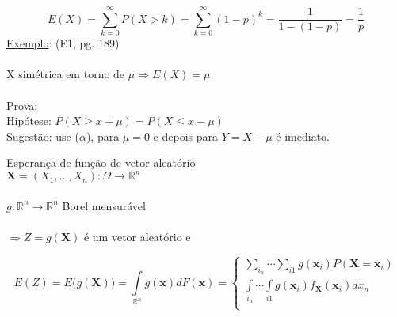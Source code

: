 \documentclass[a4paper,12pt]{article}
\begin{document}
$$E(X) = \sum\limits_{k=0}^{\infty}P(X>k)= \sum\limits_{k=0}^{\infty} (1-p)^k = \frac{1}{1-(1-p)} = \frac{1}{p}$$
\underline{Exemplo}: (E1, pg. 189)\\
\\
X simétrica em torno de $\mu \Rightarrow E(X)=\mu$\\
\\

\underline{Prova}:\\
Hipótese: $P(X\ge x+\mu )= P(X\le x-\mu)$\\
Sugestão: use ($\alpha$), para $\mu=0$ e depois para $Y=X-\mu$ é imediato.

\newpage

\underline{Esperança de função de vetor aleatório}
\\

$\bm X = (X_1,\ldots,X_n):\Omega \longrightarrow\mathbb R^n $\\
\\
$g:\mathbb R^n \longrightarrow \mathbb R^n $  Borel mensurável 
\\
\\
$\Rightarrow Z=g(\bm X)$ é um vetor aleatório
e 

$$E(Z) = E\bigg(g(\bm X)\bigg)=
\int\limits_{\mathbb R^n}g(\bm x) dF(\bm x)
=
\begin{cases}
\sum\limits_{i_n}\cdots \sum\limits_{i1} g(\bm x_i)P(\bm X=\bm x_i)\\
\int\limits_{i_n}\cdots \int\limits_{i1} g(\bm x_i)f_{\bm X}(\bm x_i)dx_n\\

\end{cases}
$$
\end{document}

